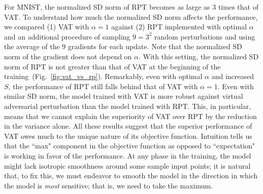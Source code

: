 \documentclass[10pt,journal,compsoc]{IEEEtran}
\begin{document}
For MNIST, the normalized SD norm of RPT becomes as large as $3$ times that of VAT.
To understand how much the normalized SD norm affects the performance, we compared (1) VAT with $\alpha =1$ against (2) RPT implemented with optimal $\alpha$ and an additional procedure of sampling $9=3^2$ random perturbations and using the average of the 9 gradients for each update. Note that the normalized SD norm of the gradient does not depend on $\alpha$.
With this setting, the normalized SD norm of RPT is not greater than that of VAT at the beginning of the training~(Fig.~\ref{fig:vat_vs_rp}).
Remarkably, even with optimal $\alpha$ and increased $S$, the performance of RPT still falls behind that of VAT with $\alpha =1$. 
Even with similar SD norm, the model trained with VAT is more robust against virtual adversarial perturbation than the model trained with RPT.
This, in particular, means that we cannot explain the superiority of VAT over RPT by the reduction in the variance alone.
All these results suggest that the superior performance of VAT owes much to the unique nature of its objective function.
Intuition tells us that the ``max" component in the objective function as opposed to ``expectation" is working in favor of the performance. 
At any phase in the training, the model might lack isotropic smoothness around some sample input points; it is natural that, to fix this, we must endeavor to smooth the model in the direction in which the model is \textit{most} sensitive; that is, we need to take the maximum.
\end{document}
